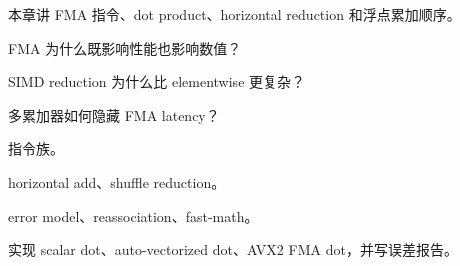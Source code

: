 {本章讲 FMA 指令、dot product、horizontal reduction 和浮点累加顺序。}
{\item FMA 为什么既影响性能也影响数值？
\item SIMD reduction 为什么比 elementwise 更复杂？
\item 多累加器如何隐藏 FMA latency？}
{\item {} 指令族。
\item horizontal add、shuffle reduction。
\item error model、reassociation、fast-math。}
{实现 scalar dot、auto-vectorized dot、AVX2 FMA dot，并写误差报告。}
